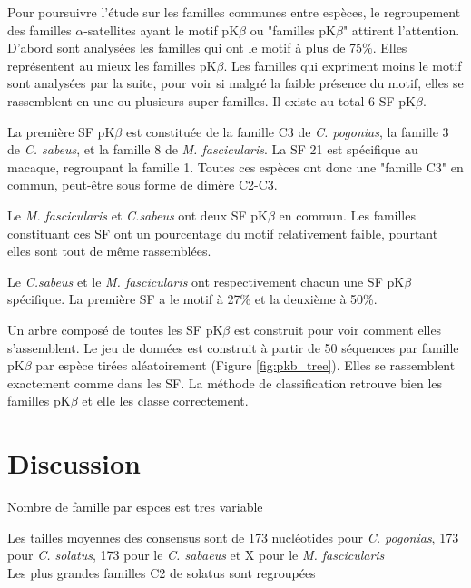 \documentclass[12pt,a4paper]{article}
\begin{document}
	Pour poursuivre l'étude sur les familles communes entre espèces, le regroupement des familles $\alpha$-satellites ayant  le motif pK$\beta$ ou "familles pK$\beta$" attirent l'attention. D'abord sont analysées les familles qui ont le motif à plus de 75\%. Elles représentent au mieux les familles pK$\beta$. Les familles qui expriment moins le motif sont analysées par la suite, pour voir si malgré la faible présence du motif, elles se rassemblent en une ou plusieurs super-familles. Il existe au total 6 SF pK$\beta$.
	
	La première SF pK$\beta$ est constituée de la famille C3 de \textit{C. pogonias}, la famille 3 de \textit{C. sabeus}, et la famille 8 de \textit{M. fascicularis}. La SF 21 est spécifique au macaque, regroupant la famille 1. Toutes ces espèces ont donc une "famille C3" en commun, peut-être sous forme de dimère C2-C3.
	
	Le \textit{M. fascicularis} et \textit{C.sabeus} ont deux SF pK$\beta$ en commun. Les familles constituant ces SF ont un pourcentage du motif relativement faible, pourtant elles sont tout de même rassemblées. 
	
	Le \textit{C.sabeus} et le \textit{M. fascicularis} ont respectivement chacun une SF pK$\beta$ spécifique. La première SF a le motif à 27\% et la deuxième à 50\%.
		
	Un arbre composé de toutes les SF pK$\beta$ est construit pour voir comment elles s'assemblent. Le jeu de données est construit à partir de 50 séquences par famille pK$\beta$ par espèce tirées aléatoirement (Figure \ref{fig:pkb_tree}). Elles se rassemblent exactement comme dans les SF. La méthode de classification retrouve bien les familles pK$\beta$ et elle les classe correctement.

\section{Discussion}

	Nombre de famille par espces est tres variable

	Les tailles moyennes des consensus sont de 173 nucléotides pour \textit{C. pogonias}, 173 pour \textit{C. solatus}, 173 pour le \textit{C. sabaeus} et X pour le \textit{M. fascicularis}\\
	
	Les plus grandes familles C2 de solatus sont regroupées\\
\end{document}
